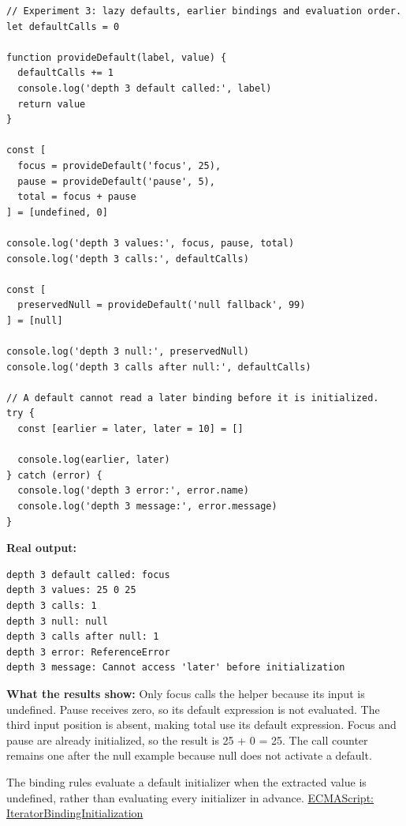 \documentclass[10pt,a4paper]{article}
\begin{document}
\begin{lstlisting}[language=GuideJS]
// Experiment 3: lazy defaults, earlier bindings and evaluation order.
let defaultCalls = 0

function provideDefault(label, value) {
  defaultCalls += 1
  console.log('depth 3 default called:', label)
  return value
}

const [
  focus = provideDefault('focus', 25),
  pause = provideDefault('pause', 5),
  total = focus + pause
] = [undefined, 0]

console.log('depth 3 values:', focus, pause, total)
console.log('depth 3 calls:', defaultCalls)

const [
  preservedNull = provideDefault('null fallback', 99)
] = [null]

console.log('depth 3 null:', preservedNull)
console.log('depth 3 calls after null:', defaultCalls)

// A default cannot read a later binding before it is initialized.
try {
  const [earlier = later, later = 10] = []

  console.log(earlier, later)
} catch (error) {
  console.log('depth 3 error:', error.name)
  console.log('depth 3 message:', error.message)
}
\end{lstlisting}


\textbf{Real output:}

\begin{lstlisting}[language={}]
depth 3 default called: focus
depth 3 values: 25 0 25
depth 3 calls: 1
depth 3 null: null
depth 3 calls after null: 1
depth 3 error: ReferenceError
depth 3 message: Cannot access 'later' before initialization
\end{lstlisting}

\textbf{What the results show:} Only focus calls the helper because its input is undefined. Pause receives zero, so its default expression is not evaluated. The third input position is absent, making total use its default expression. Focus and pause are already initialized, so the result is 25 + 0 = 25. The call counter remains one after the null example because null does not activate a default.

The binding rules evaluate a default initializer when the extracted value is undefined, rather than evaluating every initializer in advance. \href{https://tc39.es/ecma262/multipage/syntax-directed-operations.html\#sec-runtime-semantics-iteratorbindinginitialization}{ECMAScript: IteratorBindingInitialization}
\end{document}

